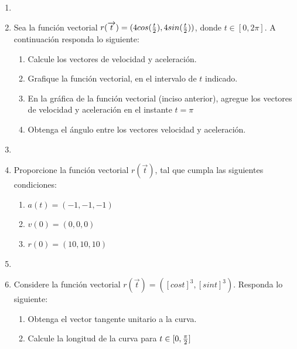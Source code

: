 \documentclass[10pt,letterpaper,fleqn]{article}
\begin{document}
    \begin{enumerate}
        \item 

        \item Sea la función vectorial $r (\overrightarrow{t}) = (4cos({t \over 2}),4sin({t \over 2}))$, donde $t \in [0,2\pi]$. A continuación responda lo siguiente:
        \begin{enumerate}
            \item Calcule los vectores de velocidad y aceleración.
            \item Grafique la función vectorial, en el intervalo de $t$ indicado.
            \item En la gráfica de la función vectorial (inciso anterior), agregue los vectores de velocidad y aceleración en el instante $t = \pi$
            \item Obtenga el ángulo entre los vectores velocidad y aceleración.
        \end{enumerate}
        
        \item

        \item Proporcione la función vectorial $r(\overrightarrow{t})$, tal que cumpla las siguientes condiciones:
        \begin{enumerate}
            \item $a(t)=(-1,-1,-1)$
            \item $v(0)=(0,0,0)$
            \item $r(0)=(10,10,10)$
        \end{enumerate}

        \item

        \item Considere la función vectorial $r(\overrightarrow{t})= ([cos t]^3,[sin t]^3)$. Responda lo siguiente:
        \begin{enumerate}
            \item Obtenga el vector tangente unitario a la curva.
            \item Calcule la longitud de la curva para $t \in [0,{\pi \over 2}]$
        \end{enumerate}


\end{enumerate}
\end{document}
